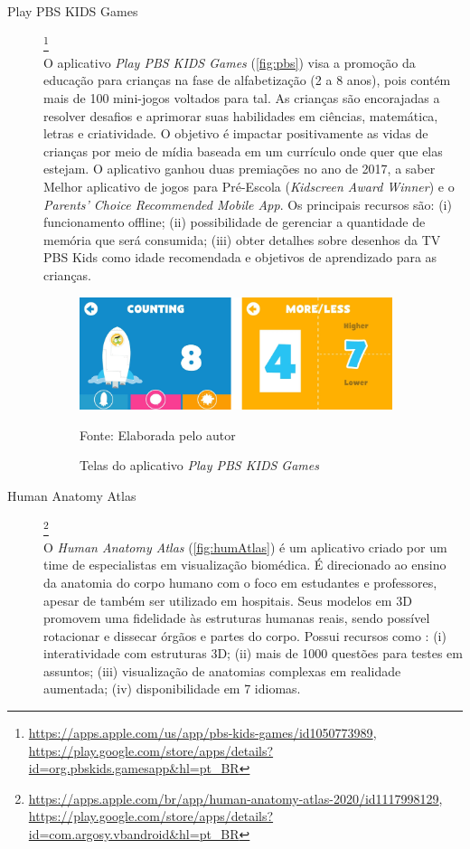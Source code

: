 \begin{description}
\item[Play PBS KIDS Games]\footnote{\url{https://apps.apple.com/us/app/pbs-kids-games/id1050773989}, \url{https://play.google.com/store/apps/details?id=org.pbskids.gamesapp&hl=pt_BR}} \hfill \\
O aplicativo \textit{Play PBS KIDS Games} (\autoref{fig:pbs}) visa a promoção da educação para crianças na fase de alfabetização (2 a 8 anos), pois contém mais de 100 mini-jogos voltados para tal. As crianças são encorajadas a resolver desafios e aprimorar suas habilidades em ciências, matemática, letras e criatividade. O objetivo é impactar positivamente as vidas de crianças por meio de mídia baseada em um currículo onde quer que elas estejam. O aplicativo ganhou duas premiações no ano de 2017, a saber Melhor aplicativo de jogos para Pré-Escola (\textit{Kidscreen Award Winner}) e o \textit{Parents' Choice Recommended Mobile App}. Os principais recursos são: (i) funcionamento offline; (ii) possibilidade de gerenciar a quantidade de memória que será consumida; (iii) obter detalhes sobre desenhos da TV PBS Kids como idade recomendada e objetivos de aprendizado para as crianças.

\begin{figure}[H]
\centering
    \caption{Telas do aplicativo \textit{Play PBS KIDS Games}}
    \label{fig:pbs}
    \includegraphics[width=0.9\textwidth]{Figuras/pbsKids.jpg}
    
    Fonte: Elaborada pelo autor
\end{figure}

\item[Human Anatomy Atlas]\footnote{\url{https://apps.apple.com/br/app/human-anatomy-atlas-2020/id1117998129}, \url{https://play.google.com/store/apps/details?id=com.argosy.vbandroid&hl=pt_BR}} \hfill \\
O \textit{Human Anatomy Atlas} (\autoref{fig:humAtlas}) é um aplicativo criado por um time de especialistas em visualização biomédica. É direcionado ao ensino da anatomia do corpo humano com o foco em estudantes e professores, apesar de também ser utilizado em hospitais. Seus modelos em 3D promovem uma fidelidade às estruturas humanas reais, sendo possível rotacionar e dissecar órgãos e partes do corpo. Possui recursos como : (i) interatividade com estruturas 3D; (ii) mais de 1000 questões para testes em assuntos; (iii) visualização de anatomias complexas em realidade aumentada; (iv) disponibilidade em 7 idiomas.


\end{description}
